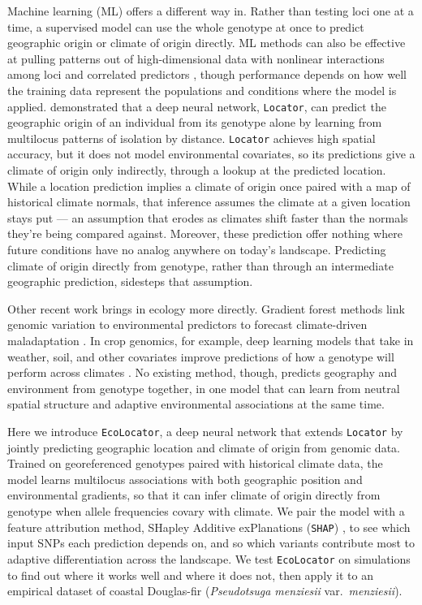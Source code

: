 \documentclass[]{article}
\newcommand{\dfir}{Douglas-fir\xspace}
\newcommand{\ecolocator}{\texttt{EcoLocator}\xspace}
\begin{document}
Machine learning (ML) offers a different way in.
Rather than testing loci one at a time, a supervised model
can use the whole genotype at once to predict
geographic origin or climate of origin directly.
ML methods can also be effective at pulling patterns
out of high-dimensional data with nonlinear interactions among loci
and correlated predictors
\citep{schrider_supervised_2018}, though performance depends 
on how well the training data represent the populations and 
conditions where the model is applied.
\citet{battey_predicting_2020} demonstrated
that a deep neural network, \texttt{Locator}, can predict
the geographic origin of an individual from its genotype alone
by learning from multilocus patterns of isolation by distance.
\texttt{Locator} achieves high spatial accuracy,
but it does not model environmental covariates,
so its predictions give a climate of origin only indirectly, 
through a lookup at the predicted location. While
a location prediction implies a climate of origin once 
paired with a map of historical climate normals, 
that inference assumes the climate at a given location 
stays put — an assumption that erodes as climates shift 
faster than the normals they're being compared against.
Moreover, these prediction offer nothing where future conditions 
have no analog anywhere on today's landscape. 
Predicting climate of origin directly from genotype, 
rather than through an intermediate geographic prediction, 
sidesteps that assumption.

Other recent work brings in ecology more directly.
Gradient forest methods link genomic variation
to environmental predictors to forecast
climate-driven maladaptation \citep{fitzpatrick_experimental_2021}. %
In crop genomics, for example, deep learning models that take in weather, soil,
and other covariates improve predictions of how a genotype will perform
across climates
\citep{washburn_predicting_2021, montesinoslopez_review_2021}.
No existing method, though, predicts geography and environment
from genotype together, in one model that can learn from
neutral spatial structure and adaptive environmental associations at the same time.

Here we introduce \ecolocator,
a deep neural network that extends \texttt{Locator}
by jointly predicting geographic location and climate of origin from genomic data.
Trained on georeferenced genotypes paired
with historical climate data,
the model learns multilocus associations
with both geographic position and environmental gradients,
so that it can infer climate of origin directly from genotype
when allele frequencies covary with climate.
We pair the model with a feature attribution method,
SHapley Additive exPlanations
(\texttt{SHAP}) \citep{lundberg_shap_2017},
to see which input SNPs each prediction depends on,
and so which variants contribute most
to adaptive differentiation across the landscape.
We test \ecolocator on simulations to find out
where it works well and where it does not,
then apply it to an empirical dataset of coastal \dfir
(\textit{Pseudotsuga menziesii} var.\ \textit{menziesii}).
\end{document}

